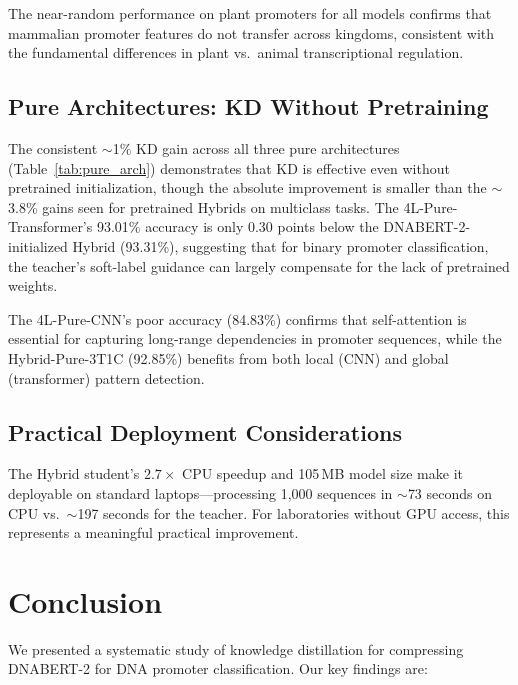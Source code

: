 \documentclass[conference]{IEEEtran}
\begin{document}
The near-random performance on plant promoters for all models confirms that mammalian promoter features do not transfer across kingdoms, consistent with the fundamental differences in plant vs.\ animal transcriptional regulation.

\subsection{Pure Architectures: KD Without Pretraining}

The consistent $\sim$1\% KD gain across all three pure architectures (Table~\ref{tab:pure_arch}) demonstrates that KD is effective even without pretrained initialization, though the absolute improvement is smaller than the $\sim$3.8\% gains seen for pretrained Hybrids on multiclass tasks. The 4L-Pure-Transformer's 93.01\% accuracy is only 0.30 points below the DNABERT-2-initialized Hybrid (93.31\%), suggesting that for binary promoter classification, the teacher's soft-label guidance can largely compensate for the lack of pretrained weights.

The 4L-Pure-CNN's poor accuracy (84.83\%) confirms that self-attention is essential for capturing long-range dependencies in promoter sequences, while the Hybrid-Pure-3T1C (92.85\%) benefits from both local (CNN) and global (transformer) pattern detection.

\subsection{Practical Deployment Considerations}

The Hybrid student's $2.7\times$ CPU speedup and 105\,MB model size make it deployable on standard laptops---processing 1,000 sequences in $\sim$73 seconds on CPU vs.\ $\sim$197 seconds for the teacher. For laboratories without GPU access, this represents a meaningful practical improvement.

\section{Conclusion}
\label{sec:conclusion}

We presented a systematic study of knowledge distillation for compressing DNABERT-2 for DNA promoter classification. Our key findings are:
\end{document}
